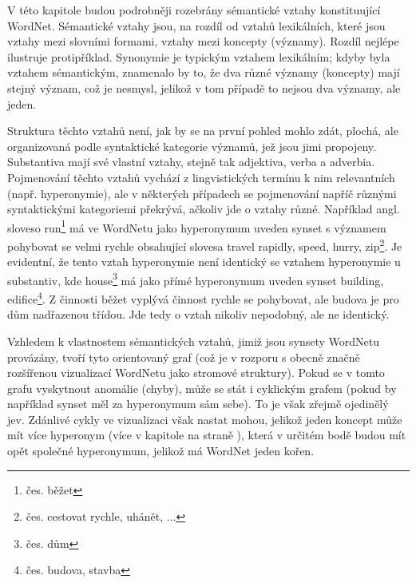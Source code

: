 \documentclass[a4paper, 11pt, oneside]{book}
\newcommand{\itNameRef}[1]{\textit{\nameref{#1}}}
\newcommand\ex{\textsf}
\begin{document}



				V této kapitole budou podrobněji rozebrány sémantické vztahy konstituující WordNet. Sémantické vztahy jsou, na rozdíl od vztahů lexikálních, které jsou vztahy mezi slovními formami, vztahy mezi koncepty (významy). Rozdíl nejlépe ilustruje protipříklad. Synonymie je typickým vztahem lexikálním; kdyby byla vztahem sémantickým, znamenalo by to, že dva různé významy (koncepty) mají stejný význam, což je nesmysl, jelikož v tom případě to nejsou dva významy, ale jeden. 

				Struktura těchto vztahů není, jak by se na první pohled mohlo zdát, plochá, ale organizovaná podle syntaktické kategorie významů, jež jsou jimi propojeny. Substantiva mají své vlastní vztahy, stejně tak adjektiva, verba a adverbia. Pojmenování těchto vztahů vychází z lingvistických termínu k nim relevantních (např. hyperonymie), ale v některých případech se pojmenování napříč různými syntaktickými kategoriemi překrývá, ačkoliv jde o vztahy různé. Například angl. sloveso \ex{run}\footnote{čes. \ex{běžet}} má ve WordNetu jako hyperonymum uveden synset s významem \ex{pohybovat se velmi rychle} obsahující slovesa \ex{travel rapidly, speed, hurry, zip}\footnote{čes. \ex{cestovat rychle, uhánět, ...}}. Je evidentní, že tento vztah hyperonymie není identický se vztahem hyperonymie u substantiv, kde \ex{house}\footnote{čes. \ex{dům}} má jako přímé hyperonymum uveden synset \ex{building, edifice}\footnote{čes. \ex{budova, stavba}}. Z činnosti \ex{běžet} vyplývá činnost \ex{rychle se pohybovat}, ale \ex{budova} je pro \ex{dům} nadřazenou třídou. Jde tedy o vztah nikoliv nepodobný, ale ne identický. \parencite{princetonWN}

				Vzhledem k vlastnostem sémantických vztahů, jimiž jsou synsety WordNetu provázány, tvoří tyto orientovaný graf (což je v rozporu s obecně značně rozšířenou vizualizací WordNetu jako stromové struktury). Pokud se v tomto grafu vyskytnout anomálie (chyby), může se stát i cyklickým grafem (pokud by například synset měl za hyperonymum sám sebe). To je však zřejmě ojedinělý jev. \parencite{richens2008anomalies} Zdánlivé cykly ve vizualizaci však nastat mohou, jelikož jeden koncept může mít více hyperonym (více v kapitole \itNameRef{cha:hyperohyp} na straně \pageref{cha:hyperohyp}), která v určitém bodě budou mít opět společné hyperonymum, jelikož má WordNet jeden kořen.
\end{document}
